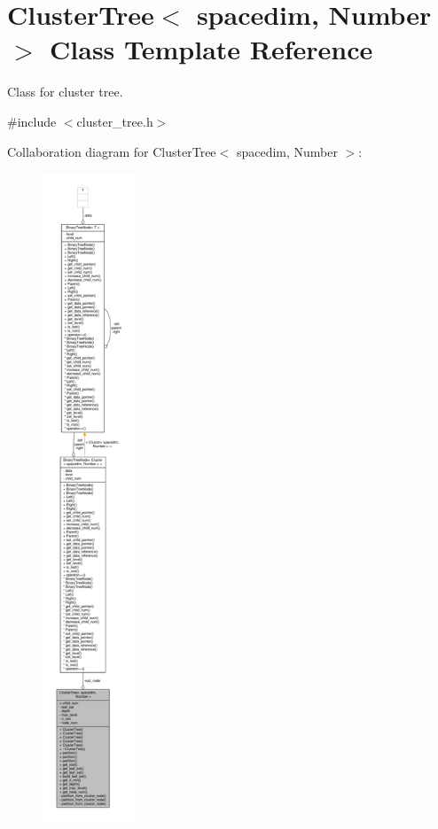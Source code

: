 \hypertarget{classClusterTree}{}\section{Cluster\+Tree$<$ spacedim, Number $>$ Class Template Reference}
\label{classClusterTree}


Class for cluster tree.  




{\ttfamily \#include $<$cluster\+\_\+tree.\+h$>$}



Collaboration diagram for Cluster\+Tree$<$ spacedim, Number $>$\+:\nopagebreak
\begin{figure}[H]
\begin{center}
\leavevmode
\includegraphics[height=550pt]{classClusterTree__coll__graph}
\end{center}
\end{figure}
